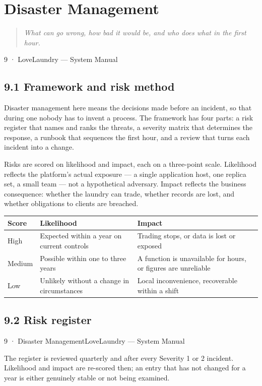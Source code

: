 \documentclass[11pt,a4paper,oneside]{book}
\begin{document}
\chapter{Disaster Management}
\begin{quote}\itshape What can go wrong, how bad it would be, and who does what in the first hour.\end{quote}
9 · LoveLaundry — System Manual

\section{9.1 Framework and risk method}
Disaster management here means the decisions made before an incident, so that during one nobody has to invent a process. The framework has four parts: a risk register that names and ranks the threats, a severity matrix that determines the response, a runbook that sequences the first hour, and a review that turns each incident into a change.

Risks are scored on likelihood and impact, each on a three-point scale. Likelihood reflects the platform's actual exposure — a single application host, one replica set, a small team — not a hypothetical adversary. Impact reflects the business consequence: whether the laundry can trade, whether records are lost, and whether obligations to clients are breached.

\begin{center}\small
\begin{tabularx}{\linewidth}{|X|X|X|}
\hline
\rowcolor{lightgrey}
\textbf{Score} & \textbf{Likelihood} & \textbf{Impact} \\ \hline
High & Expected within a year on current controls & Trading stops, or data is lost or exposed \\ \hline
Medium & Possible within one to three years & A function is unavailable for hours, or figures are unreliable \\ \hline
Low & Unlikely without a change in circumstances & Local inconvenience, recoverable within a shift \\ \hline
\end{tabularx}
\end{center}
\section{9.2 Risk register}
9 · Disaster ManagementLoveLaundry — System Manual

The register is reviewed quarterly and after every Severity 1 or 2 incident. Likelihood and impact are re-scored then; an entry that has not changed for a year is either genuinely stable or not being examined.
\end{document}
